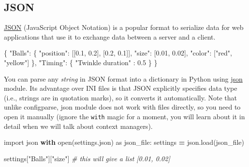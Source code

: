 \documentclass[
]{book}
\newenvironment{Shaded}{\begin{snugshade}}{\end{snugshade}}
\newcommand{\BuiltInTok}[1]{#1}
\newcommand{\CommentTok}[1]{\textcolor[rgb]{0.56,0.35,0.01}{\textit{#1}}}
\newcommand{\ControlFlowTok}[1]{\textcolor[rgb]{0.13,0.29,0.53}{\textbf{#1}}}
\newcommand{\DataTypeTok}[1]{\textcolor[rgb]{0.13,0.29,0.53}{#1}}
\newcommand{\FloatTok}[1]{\textcolor[rgb]{0.00,0.00,0.81}{#1}}
\newcommand{\FunctionTok}[1]{\textcolor[rgb]{0.00,0.00,0.00}{#1}}
\newcommand{\ImportTok}[1]{#1}
\newcommand{\NormalTok}[1]{#1}
\newcommand{\OperatorTok}[1]{\textcolor[rgb]{0.81,0.36,0.00}{\textbf{#1}}}
\newcommand{\OtherTok}[1]{\textcolor[rgb]{0.56,0.35,0.01}{#1}}
\newcommand{\StringTok}[1]{\textcolor[rgb]{0.31,0.60,0.02}{#1}}
\begin{document}
\hypertarget{json}{%
\subsection{JSON}\label{json}}

\href{https://en.wikipedia.org/wiki/JSON}{JSON} (JavaScript Object Notation) is a popular format to serialize data for web applications that use it to exchange data between a server and a client.

\begin{Shaded}
\begin{Highlighting}[]
\FunctionTok{\{}
  \DataTypeTok{"Balls"}\FunctionTok{:} \FunctionTok{\{}
    \DataTypeTok{"position"}\FunctionTok{:} \OtherTok{[[}\FloatTok{0.1}\OtherTok{,} \FloatTok{0.2}\OtherTok{],} \OtherTok{[}\FloatTok{0.2}\OtherTok{,} \FloatTok{0.1}\OtherTok{]]}\FunctionTok{,}
    \DataTypeTok{"size"}\FunctionTok{:} \OtherTok{[}\FloatTok{0.01}\OtherTok{,} \FloatTok{0.02}\OtherTok{]}\FunctionTok{,}
    \DataTypeTok{"color"}\FunctionTok{:} \OtherTok{[}\StringTok{"red"}\OtherTok{,} \StringTok{"yellow"}\OtherTok{]}
  \FunctionTok{\},}
  \DataTypeTok{"Timing"}\FunctionTok{:} \FunctionTok{\{}
    \DataTypeTok{"Twinkle duration"} \FunctionTok{:} \FloatTok{0.5}
  \FunctionTok{\}}
\FunctionTok{\}}
\end{Highlighting}
\end{Shaded}

You can parse any \emph{string} in JSON format into a dictionary in Python using \href{https://docs.python.org/3/library/json.html}{json} module. Its advantage over INI files is that JSON explicitly specifies data type (i.e., strings are in quotation marks), so it converts it automatically. Note that unlike configparse, json module does not work with files directly, so you need to open it manually (ignore the \texttt{with} magic for a moment, you will learn about it in detail when we will talk about context managers).

\begin{Shaded}
\begin{Highlighting}[]
\ImportTok{import}\NormalTok{ json}
\ControlFlowTok{with} \BuiltInTok{open}\NormalTok{(}\StringTok{\textquotesingle{}settings.json\textquotesingle{}}\NormalTok{) }\ImportTok{as}\NormalTok{ json\_file:}
\NormalTok{    settings }\OperatorTok{=}\NormalTok{ json.load(json\_file)}
    
\NormalTok{settings[}\StringTok{"Balls"}\NormalTok{][}\StringTok{"size"}\NormalTok{] }\CommentTok{\# this will give a list [0.01, 0.02]}
\end{Highlighting}
\end{Shaded}
\end{document}
